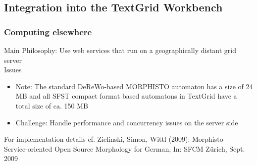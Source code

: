 \documentclass {beamer}
\begin{document}
\subsection{Integration into the TextGrid Workbench}
\frame
{  \frametitle{Computing elsewhere}
Main Philosophy: Use web services that run on a geographically distant grid server\\
Issues
\begin{itemize} 
\item Note: The standard DeReWo-based MORPHISTO automaton has a size of 24 MB and all SFST compact format based automatons in TextGrid have a total size of ca. 150 MB
\item Challenge: Handle performance and concurrency issues on the server side\\
\end{itemize}
For implementation details cf. Zielinski, Simon, Wittl (2009): Morphisto - Service-oriented Open Source Morphology for German, In: SFCM Zürich, Sept. 2009
}
\end{document}

